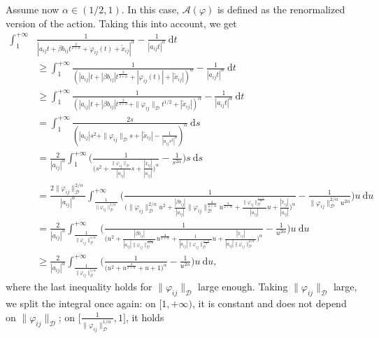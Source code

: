 \documentclass[a4paper,10pt]{amsart}
\newcommand{\ud}{\mathrm{d}}
\theoremstyle{plain}
\theoremstyle{definition}
\numberwithin{equation}{section}
\numberwithin{thm}{section}
\begin{document}
Assume now $\alpha \in (1/2,1)$. In this case, $\mathcal{A}(\varphi)$ is defined as the renormalized version of the action. Taking this into account, we get
\[
\begin{split}
    \int_{1}^{+\infty} &\frac{1}{|a_{ij}t + \beta b_{ij}t^{\frac{2}{2+\alpha}} + \varphi_{ij}(t) + \tilde x_{ij}|^\alpha} - \frac{1}{|a_{ij}t|^\alpha}\ \ud t \\
    &\ge \int_{1}^{+\infty} \frac{1}{(|a_{ij}|t + |\beta b_{ij}|t^{\frac{2}{2+\alpha}}+ |\varphi_{ij}(t)| + |\tilde x_{ij}|)^\alpha} - \frac{1}{|a_{ij}t|^\alpha}\ \ud t\\
    & \ge \int_{1}^{+\infty} \frac{1}{(|a_{ij}|t+ |\beta b_{ij}|t^{\frac{2}{2+\alpha}} + \|\varphi_{ij}\|_\mathcal{D}t^{1/2} + |\tilde x_{ij}|)^\alpha} - \frac{1}{|a_{ij}t|^\alpha}\ \ud t\\
    & = \int_{1}^{+\infty} \frac{2s}{(|a_{ij}|s^2 + \|\varphi_{ij}\|_\mathcal{D}s + |\tilde x_{ij}| - \frac{1}{|a_{ij}s^2|^\alpha})^\alpha}\ \ud s\\
    & =\frac{2}{|a_{ij}|^\alpha} \int_{1}^{+\infty} \bigg(\frac{1}{\big(s^2 + \frac{\|\varphi_{ij}\|_\mathcal{D}}{|a_{ij}|}s + \frac{|\tilde x_{ij}|}{|a_{ij}|}\big)^\alpha} - \frac{1}{s^{2\alpha}}\bigg)s\ \ud s\\
    & = \frac{2\|\varphi_{ij}\|_\mathcal{D}^{2/\alpha}}{|a_{ij}|^\alpha} \int_{\frac{1}{\|\varphi_{ij}\|_\mathcal{D}^{1/\alpha}}}^{+\infty}
    \bigg(\frac{1}{\big(\|\varphi_{ij}\|_\mathcal{D}^{2/\alpha}u^2 + \frac{|\beta b_{ij}|}{|a_{ij}|}\|\varphi_{ij}\|_\mathcal{D}^{\frac{4}{2+\alpha}}u^{\frac{4}{2+\alpha}}+\frac{\|\varphi_{ij}\|_\mathcal{D}^{\frac{1+\alpha}{\alpha}}}{|a_{ij}|}u+\frac{|\tilde x_{ij}|}{|a_{ij}|}\big)^\alpha}-\frac{1}{\|\varphi_{ij}\|_\mathcal{D}^{2/\alpha}u^{2\alpha}}\bigg)u\ \ud u\\
    & = \frac{2}{|a_{ij}|^\alpha} \int_{\frac{1}{\|\varphi_{ij}\|_\mathcal{D}^{1/\alpha}}}^{+\infty}
    \bigg(\frac{1}{\big(u^2 + \frac{|\beta b_{ij}|}{|a_{ij}|\|\varphi_{ij}\|_\mathcal{D}^{\frac{\alpha}{2+\alpha}}}u^{\frac{4}{2+\alpha}}+\frac{1}{|a_{ij}|\|\varphi_{ij}\|_\mathcal{D}^{\frac{1-\alpha}{\alpha}}}u+\frac{|\tilde x_{ij}|}{|a_{ij}|\|\varphi_{ij}\|_\mathcal{D}^{2/\alpha}}\big)^\alpha}-\frac{1}{u^{2\alpha}}\bigg)u\ \ud u\\
    &\ge \frac{2}{|a_{ij}|^\alpha} \int_{\frac{1}{\|\varphi_{ij}\|_\mathcal{D}^{1/\alpha}}}^{+\infty}
    \bigg(\frac{1}{\big(u^2 + u^{\frac{4}{2+\alpha}}+u+1\big)^\alpha}-\frac{1}{u^{2\alpha}}\bigg)u\ \ud u,
\end{split}
\]
where the last inequality holds for $\|\varphi_{ij}\|_\mathcal{D}$ large enough. Taking $\|\varphi_{ij}\|_\mathcal{D}$ large, we split the integral once again: on $[1,+\infty)$, it is constant and does not depend on $\|\varphi_{ij}\|_\mathcal{D}$; on $\bigg[\frac{1}{\|\varphi_{ij}\|_\mathcal{D}^{1/\alpha}},1\bigg]$, it holds
\end{document}
